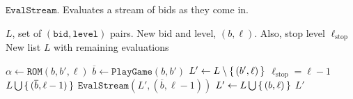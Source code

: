 \documentclass[11pt]{article}
\begin{document}
\begin{algorithm}
	\caption{$\texttt{EvalStream}$. Evaluates a stream of bids as they come in.}
	\label{alg:distrEval}
	\begin{algorithmic}
		\Require $L$, set of $(\texttt{bid}, \texttt{level})$ pairs. New bid and level, $(b, \ell)$. Also, stop level $\ell_{\mathrm{stop}}$
		\Ensure New list $L$ with remaining evaluations
		
		  \State $\alpha \gets \texttt{ROM}(b, b', \ell)$
		  \State $\overline{b} \gets \texttt{PlayGame}(b, b')$
		  \State $L' \gets L \setminus \set{(b', \ell)}$
      \If $\ell_{\mathrm{stop}} = \ell - 1$
        \State \Return $L \bigcup \set{(\overline{b}, \ell - 1)}$
      \Else
		    \State \Return $\texttt{EvalStream}(L', (\overline{b}, \ell - 1))$
    \EndIf
		\Else
		\State $L' \gets L \bigcup \set{(b, \ell)}$
		\State \Return $L'$
		\EndIf
	\end{algorithmic}
\end{algorithm}
\end{document}
